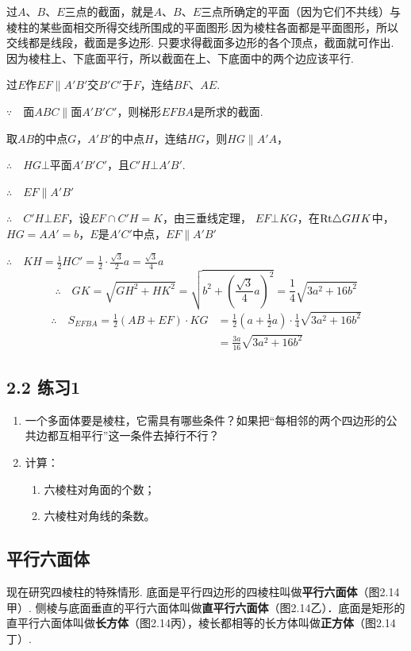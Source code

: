 \begin{analyze}
过$A$、$B$、$E$三点的截面，就是$A$、$B$、$E$三点所确定的平面（因为它们不共线）与棱柱的某些面相交所得交线所围成的平面图形.因为棱柱各面都是平面图形，所以交线都是线段，截面是多边形. 只要求得截面多边形的各个顶点，截面就可作出. 因为棱柱上、下底面平行，所以截面在上、下底面中的两个边应该平行.
\end{analyze}

\begin{solution}
过$E$作$EF\parallel A'B'$交$B'C'$于$F$，连结$BF$、$AE$.

$\because\quad $面$ABC\parallel $面$A'B'C'$，则梯形$EFBA$是所求的截面.

取$AB$的中点$G$，$A'B'$的中点$H$，连结$HG$，则$HG\parallel A'A$，

$\therefore\quad HG\bot $平面$A'B'C'$，且$C'H\bot A'B'$.

$\therefore\quad EF\parallel A'B'$

$\therefore\quad C'H\bot EF$，设$EF\cap C'H=K$，由三垂线定理，
$EF\bot KG$，在${\rm Rt}\triangle GHK$中，$HG=AA'=b$，$E$是$A'C'$中点，$EF\parallel A'B'$

$\therefore\quad KH=\frac{1}{2}HC'=\frac{1}{2}\cdot \frac{\sqrt{3}}{2}a=\frac{\sqrt{3}}{4}a$
\[ \therefore\quad GK=\sqrt{GH^2+HK^2}=\sqrt{b^2+\left(\frac{\sqrt{3}}{4}a\right)^2}=\frac{1}{4}\sqrt{3a^2+16b^2}\]
\[\begin{split}
 \therefore\quad S_{EFBA}=\frac{1}{2}(AB+EF)\cdot KG &=\frac{1}{2}\left(a+\frac{1}{2}a\right)\cdot \frac{1}{4}\sqrt{3a^2+16b^2}\\
    &=\frac{3a}{16}\sqrt{3a^2+16b^2}
\end{split}\]
\end{solution}

\subsection*{2.2 练习1}
\begin{enumerate}
\item 一个多面体要是棱柱，它需具有哪些条件？如果把“每相邻的两个四边形的公共边都互相平行”这一条件去掉行不行？
\item 计算：
\begin{enumerate}[(1)]
\item 六棱柱对角面的个数；
\item 六棱柱对角线的条数。
\end{enumerate}
\end{enumerate}


\subsection{平行六面体}
现在研究四棱柱的特殊情形.
底面是平行四边形的四棱柱叫做\textbf{平行六面体}（图2.14甲）. 侧棱与底面垂直的平行六面体叫做\textbf{直平行六面体}（图2.14乙）．底面是矩形的直平行六面体叫做\textbf{长方体}（图2.14丙），棱长都相等的长方体叫做\textbf{正方体}（图2.14丁）.

